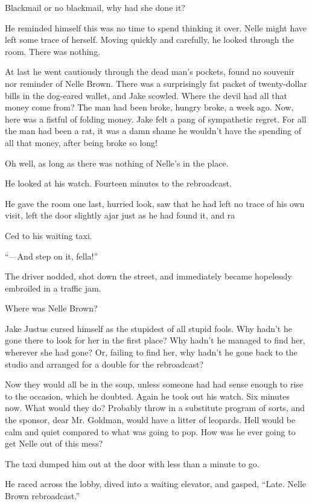 \documentclass{novel}
\begin{document}
Blackmail or no blackmail, why had she done it?

He reminded himself this was no time to spend thinking it over. Nelle might have left some trace of herself. Moving quickly and carefully, he looked through the room. There was nothing.

At last he went cautiously through the dead man's pockets, found no souvenir nor reminder of Nelle Brown. There was a surprisingly fat packet of twenty-dollar bills in the dog-eared wallet, and Jake scowled. Where the devil had all that money come from? The man had been broke, hungry broke, a week ago. Now, here was a fistful of folding money. Jake felt a pang of sympathetic regret. For all the man had been a rat, it was a damn shame he wouldn't have the spending of all that money, after being broke so long!

Oh well, as long as there was nothing of Nelle's in the place.

He looked at his watch. Fourteen minutes to the rebroadcast.

He gave the room one last, hurried look, saw that he had left no trace of his own visit, left the door slightly ajar just as he had found it, and ra

Ced to his waiting taxi.

“—And step on it, fella!”

The driver nodded, shot down the street, and immediately became hopelessly embroiled in a traffic jam.

Where was Nelle Brown?

Jake Justus cursed himself as the stupidest of all stupid fools. Why hadn’t he gone there to look for her in the first place? Why hadn’t he managed to find her, wherever she had gone? Or, failing to find her, why hadn’t he gone back to the studio and arranged for a double for the rebroadcast?

Now they would all be in the soup, unless someone had had sense enough to rise to the occasion, which he doubted. Again he took out his watch. Six minutes now. What would they do? Probably throw in a substitute program of sorts, and the sponsor, dear Mr. Goldman, would have a litter of leopards. Hell would be calm and quiet compared to what was going to pop. How was he ever going to get Nelle out of this mess?

The taxi dumped him out at the door with less than a minute to go.

He raced across the lobby, dived into a waiting elevator, and gasped, “Late. Nelle Brown rebroadcast.”
\end{document}
